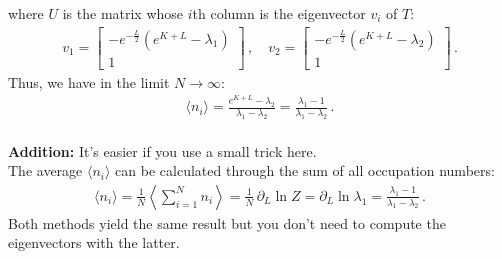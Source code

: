 where $U$ is the matrix whose $i$th column is the eigenvector $v_i$ of $T$:
\begin{align}
	v_1 = 
	\begin{bmatrix}
    -e^{-\frac{L}{2}}\left(e^{K+L}-\lambda_1\right) \\
    1
    \end{bmatrix} \,, \quad
    v_2 = 
	\begin{bmatrix}
    -e^{-\frac{L}{2}}\left(e^{K+L}-\lambda_2\right) \\
    1
    \end{bmatrix} \,.
\end{align}
Thus, we have in the limit $N\to\infty$:
\begin{align}
	\langle n_i\rangle = 
	\frac{e^{K+L}-\lambda_2}{\lambda_1-\lambda_2} 
	= \frac{\lambda_1 - 1}{\lambda_1-\lambda_2} \,.
\end{align}
\ \\
\textbf{Addition:} It's easier if you use a small trick here. \\
The average $\langle n_i\rangle$ can be calculated through the sum of all occupation numbers:
\begin{align}
	\langle n_i\rangle = \frac{1}{N} \left\langle\sum_{i=1}^N n_i\right\rangle
	= \frac{1}{N} \, \partial_{L} \ln Z = \partial_{L} \ln \lambda_1
	= \frac{\lambda_1 - 1}{\lambda_1-\lambda_2} \,.
\end{align}
Both methods yield the same result but you don't need to compute the eigenvectors with the latter.